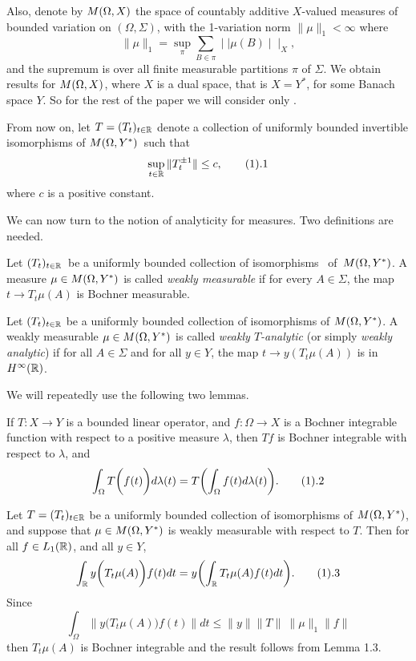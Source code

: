    Also, denote   by $M(\Omega, X)$  the space of countably additive $X$-valued
measures of bounded variation on  $(\Omega, \Sigma)$, with the
1-variation
norm $\| \mu \|_1 < \infty$ where
$$ \| \mu \|_1 = \sup_{\pi} \sum_{B\in\pi}\mid\mid \mu(B)\mid\mid_{X} ,$$
and the supremum is over all  finite  measurable partitions $\pi$
of $\Sigma$.
   We obtain results for $M(\Omega, X)$, where  $X$ is a dual space, that is
$X=Y^*$,
for some Banach space $Y$.  So for the rest of the paper we will consider
only  \Mstuff.

 From now on, let $T=(T_t)_{t\in \Bbb R}$ denote a collection of
uniformly bounded invertible isomorphisms of $M(\Omega, Y^*) \,$  such that
            $$\sup_{t\in \R}\|T_t^{\pm 1}\| \le c,\tag1.1 $$
where $c$ is a positive constant.

We can now turn to the notion of analyticity
for measures.  Two definitions are needed.

   Let $(T_t)_{t \in \Bbb R}\,$  be a uniformly
bounded
collection of   isomorphisms $\,$  of $\, M(\Omega, Y^*) $.
A measure $\mu\in M(\Omega, Y^*) $  is called {\it weakly measurable\/} if for every
$A\in\Sigma$, the map
$t\to T_t \mu(A)$ is Bochner measurable.\enddefinition

Let $(T_t)_{t\in \Bbb R}$  be a uniformly bounded
collection of isomorphisms of $M(\Omega, Y^*)$.  A weakly measurable $\mu\in M(\Omega, Y^*)$
is called  {\it weakly $T$-analytic\/} (or simply {\it weakly analytic})
if for all $A\in \Sigma$ and for all $y\in Y$, the map $t\to
y(T_t\mu(A))$ is
in
$H^{\infty}(\Bbb R)$.
           \enddefinition

We will repeatedly use the following two lemmas.

If $T:X\to Y$  is a bounded linear operator, and $f:\Omega \to X$
is a Bochner
integrable function with respect to a positive measure $\lambda$,
then $Tf$ is Bochner integrable with respect to $\lambda$, and
$$ \int_{\Omega} T\biggl (f(t)\biggr) d \lambda (t) =
   T \biggl(\int_{\Omega} f(t) d\lambda (t) \biggr).\tag1.2$$
\endproclaim

Let $T = (T_t)_{t\in \Bbb R}$  be a uniformly bounded
collection of isomorphisms of $M(\Omega, Y^*)$, and suppose that
$\mu\in M(\Omega, Y^*)$  is weakly measurable with respect to $T$.  Then for all $f\in
L_1(\Bbb R)$,
and all $y \in Y$,
$$ \int_{\R} y\bigg(T_t \mu(A)\bigg)  f(t) dt =
y\biggl(\int_{\R} T_t \mu(A) f(t) dt\biggr).\tag1.3$$
\endproclaim
\prf  Since
$$\int_{\Omega} \|y\big (T_t \mu (A)\big) f(t)\| d t \le \|y\| \| T\|\
\|\mu\|_1 \|f\| $$
then $T_t \mu(A)$ is Bochner integrable and the result follows from
Lemma 1.3.\endprf

